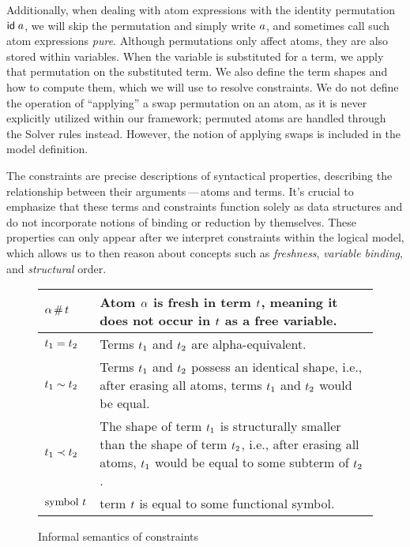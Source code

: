 \documentclass[english, mgr]{iithesis}
\renewcommand{\it}[1]{\textit{#1}}
\newcommand{\mdash}{\,---\,}
\def\-{{\mdash}}
\begin{document}
Additionally, when dealing with atom expressions with the identity permutation $\mathsf{id} \;a$,
we will skip the permutation and simply write $a$,
and sometimes call such atom expressions \it{pure}.
Although permutations only affect atoms, they are also stored within variables.
When the variable is substituted for a term, we apply that permutation
on the substituted term.
We also define the term shapes and how to compute them, which
we will use to resolve constraints.
We do not define the operation of ``applying'' a swap permutation on
an atom, as it is never explicitly utilized within our framework;
permuted atoms are handled through the Solver rules instead.
However, the notion of applying swaps is included in the
model definition.

The constraints are precise descriptions of syntactical properties,
describing the relationship between their arguments\-atoms and terms.
It's crucial to emphasize that these terms and constraints function
solely as data structures and do not incorporate notions of binding or reduction by themselves.
These properties can only appear after we interpret
constraints within the logical model, which allows us to then reason about
concepts such as \it{freshness}, \it{variable binding}, and \it{structural} order.
\begin{figure}[hbtp]
  \centering
  \begin{tabularx}{\linewidth}{|l|X|}
    \hline
    $\alpha \,\#\, t$ & Atom $\alpha$ is fresh in term $t$, meaning it does not occur in $t$ as a free variable. \\
    \hline
    $t_1 = t_2$ & Terms $t_1$ and $t_2$ are alpha-equivalent. \\
    \hline
    $t_1 \sim t_2$ & Terms $t_1$ and $t_2$ possess an identical shape, i.e., after erasing all atoms, terms $t_1$ and $t_2$ would be equal. \\
    \hline
    $t_1 \prec t_2$ & The shape of term $t_1$ is structurally smaller than the shape of term $t_2$, i.e., after erasing all atoms, $t_1$ would be equal to some subterm of $t_2$. \\
    \hline
    $\text{symbol } t$ & term $t$ is equal to some functional symbol. \\
    \hline
  \end{tabularx}
  \caption{Informal semantics of constraints}
  \label{fig:informal-constraints-semantics}
\end{figure}
\end{document}
